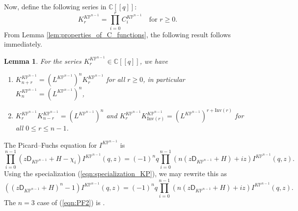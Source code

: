 \documentclass[12pt]{amsart}
\newtheorem{lem}[prop]{Lemma}
\numberwithin{equation}{section}
\newcommand{\KP}{K\mathbb{P}}
\begin{document}
Now, define the following series in $\mathbb{C}[\![q]\!]$:
\begin{equation}\label{eqn:K_i_definition}
K^{\KP^{n-1}}_r=\prod_{i=0}^rC^{\KP^{n-1}}_i\quad\text{for } r\geq{0}.
\end{equation}
From Lemma \ref{lem:properties_of_C_functions}, the following result follows immediately.
\begin{lem}\label{lem:properties_of_K_series}
For the series $K^{\KP^{n-1}}_r\in\mathbb{C}[\![q]\!]$, we have
\begin{enumerate}
    \item $K^{\KP^{n-1}}_{n+r}=(L^{\KP^{n-1}})^nK^{\KP^{n-1}}_r$ for all $r\geq{0}$, in particular $K^{\KP^{n-1}}_n=(L^{\KP^{n-1}})^n$, \label{Kfunctions1}
    \item $K^{\KP^{n-1}}_rK^{\KP^{n-1}}_{n-r}=(L^{\KP^{n-1}})^n$ and $K^{\KP^{n-1}}_rK^{\KP^{n-1}}_{\mathrm{Inv}(r)}=(L^{\KP^{n-1}})^{r+\mathrm{Inv}(r)}$ for all $0\leq r \leq n-1$.
\end{enumerate}
\end{lem}



The Picard--Fuchs equation for $I^{\KP^{n-1}}$ is
\begin{equation}\label{eqn:PF1}
\prod_{i=0}^{n-1}\left(z\mathsf{D}_{K\mathbb{P}^{n-1}}+H-\chi_i\right)I^{\KP^{n-1}}(q,z)=(-1)^nq\prod_{i=0}^{n-1}\left(n\left(z\mathsf{D}_{K\mathbb{P}^{n-1}}+H\right)+iz\right)I^{\KP^{n-1}}(q,z).    
\end{equation}
Using the specialization (\ref{eqn:specialization_KP}), we may rewrite this as
\begin{equation}\label{eqn:PF2}
\left(\left(z\mathsf{D}_{K\mathbb{P}^{n-1}}+H\right)^n-1\right)I^{\KP^{n-1}}(q,z)=(-1)^nq\prod_{i=0}^{n-1}\left(n\left(z\mathsf{D}_{K\mathbb{P}^{n-1}}+H\right)+iz\right)I^{\KP^{n-1}}(q,z).        
\end{equation}
The $n=3$ case of (\ref{eqn:PF2}) is \cite[Equation (26)]{lho-p}.
\end{document}
